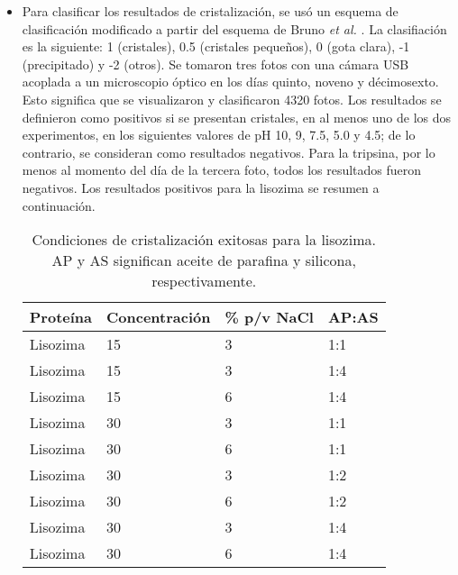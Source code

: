\begin{enumerate}
\begin{itemize}
		\item Para clasificar los resultados de cristalización, se usó un esquema de clasificación modificado a partir del esquema de Bruno \emph{et al.} \cite{Bruno2018}. La clasifiación es la siguiente: 1 (cristales), 0.5 (cristales pequeños), 0 (gota clara), -1 (precipitado) y -2 (otros). Se tomaron tres fotos con una cámara USB acoplada a un microscopio óptico en los días quinto, noveno y décimosexto. Esto significa que se visualizaron y clasificaron \num{4320} fotos. Los resultados se definieron como positivos si se presentan cristales, en al menos uno de los dos experimentos, en los siguientes valores de pH 10, 9, 7.5, 5.0 y 4.5; de lo contrario, se consideran como resultados negativos. Para la tripsina, por lo menos al momento del día de la tercera foto, todos los resultados fueron negativos. Los resultados positivos para la lisozima se resumen a continuación.
		
		
		\begin{table}[h]
			\centering
			\begin{tabular}{@{}llll@{}}
				\toprule
				Proteína & Concentración & \% p/v NaCl & AP:AS \\ \midrule
				Lisozima & 15 & 3 & 1:1 \\
				Lisozima & 15 & 3 & 1:4 \\
				Lisozima & 15 & 6 & 1:4 \\
				Lisozima & 30 & 3 & 1:1 \\
				Lisozima & 30 & 6 & 1:1 \\
				Lisozima & 30 & 3 & 1:2 \\
				Lisozima & 30 & 6 & 1:2 \\
				Lisozima & 30 & 3 & 1:4 \\
				Lisozima & 30 & 6 & 1:4 \\ \bottomrule
			\end{tabular}
			\caption{Condiciones de cristalización exitosas para la lisozima. AP y AS significan aceite de parafina y silicona, respectivamente.}
			\label{tab:my-table}
		\end{table}
	\end{itemize}


\end{enumerate}
